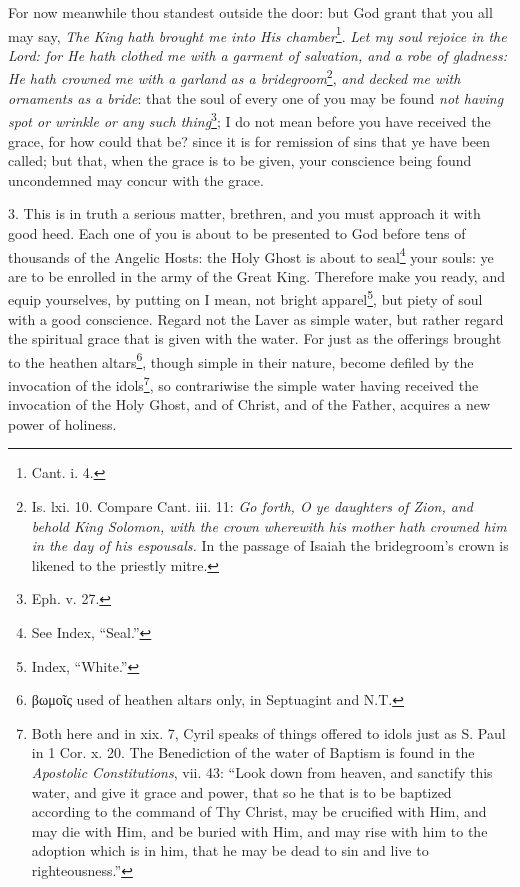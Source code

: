 For now meanwhile thou standest outside the door: but God grant that you all may say, \emph{The King hath brought me into His chamber}\footnote{Cant. i. 4.}. \emph{Let my soul rejoice in the Lord: for He hath clothed me with a garment of salvation, and a robe of gladness: He hath crowned me with a garland as a bridegroom}\footnote{Is. lxi. 10. Compare Cant. iii. 11: \emph{Go forth, O ye daughters of Zion, and behold King Solomon, with the crown wherewith his mother hath crowned him in the day of his espousals.} In the passage of Isaiah the bridegroom’s crown is likened to the priestly mitre.}, \emph{and decked me with ornaments as a bride}: that the soul of every one of you may be found \emph{not having spot or wrinkle or any such thing}\footnote{Eph. v. 27.}; I do not mean before you have received the grace, for how could that be? since it is for remission of sins that ye have been called; but that, when the grace is to be given, your conscience being found uncondemned may concur with the grace.

3. This is in truth a serious matter, brethren, and you must approach it with good heed. Each one of you is about to be presented to God before tens of thousands of the Angelic Hosts: the Holy Ghost is about to seal\footnote{See Index, “Seal.”} your souls: ye are to be enrolled in the army of the Great King. Therefore make you ready, and equip yourselves, by putting on I mean, not bright apparel\footnote{Index, “White.”}, but piety of soul with a good conscience. Regard not the Laver as simple water, but rather regard the spiritual grace that is given with the water. For just as the offerings brought to the heathen altars\footnote{\textgreek{βωμοῖς} used of heathen altars only, in Septuagint and N.T.}, though simple in their nature, become defiled by the invocation of the idols\footnote{Both here and in xix. 7, Cyril speaks of things offered to idols just as S. Paul in 1 Cor. x. 20. The Benediction of the water of Baptism is found in the \emph{Apostolic Constitutions}, vii. 43: “Look down from heaven, and sanctify this water, and give it grace and power, that so he that is to be baptized according to the command of Thy Christ, may be crucified with Him, and may die with Him, and be buried with Him, and may rise with him to the adoption which is in him, that he may be dead to sin and live to righteousness.”}, so contrariwise the simple water having received the invocation of the Holy Ghost, and of Christ, and of the Father, acquires a new power of holiness.

